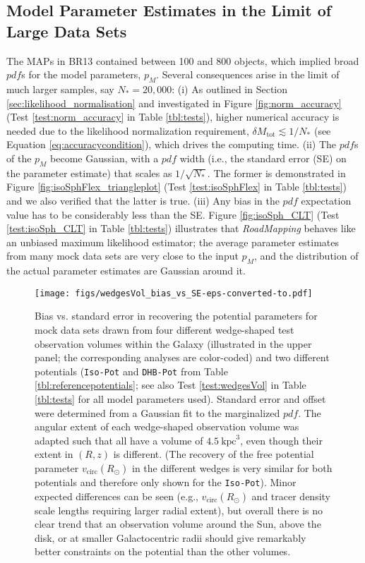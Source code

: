 \documentclass[iop,revtex4,numberedappendix,appendixfloats]{emulateapj}
\newcommand{\pdf}{\ensuremath{pdf}}
\newcommand{\pmodel}{\ensuremath{p_M}}
\newcommand{\MAP}{MAP}
\newcommand{\RM}{{\sl RoadMapping}}
\begin{document}
\subsection{Model Parameter Estimates in the Limit of Large Data Sets} \label{sec:largedata}

The \MAP{}s in BR13 contained between 100 and 800 objects, which implied broad \pdf{}s for the model parameters, $\pmodel{}$. Several consequences arise in the limit of much larger samples, say $N_{*} = 20,000$: (i) As outlined in Section \ref{sec:likelihood_normalisation} and investigated in Figure \ref{fig:norm_accuracy} (Test \ref{test:norm_accuracy} in Table \ref{tbl:tests}), higher numerical accuracy is needed due to the likelihood normalization requirement, $\delta M_\text{tot} \lesssim 1/N_{*}$ (see Equation \eqref{eq:accuracycondition}), which drives the computing time. (ii) The \pdf{}s of the \pmodel{} become Gaussian, with a \pdf{} width (i.e., the standard error (SE) on the parameter estimate) that scales as $1/\sqrt{N_{*}}$. The former is demonstrated in Figure \ref{fig:isoSphFlex_triangleplot} (Test \ref{test:isoSphFlex} in Table \ref{tbl:tests}) and we also verified that the latter is true. (iii) Any bias in the \pdf{} expectation value has to be considerably less than the SE. Figure \ref{fig:isoSph_CLT} (Test \ref{test:isoSph_CLT} in Table \ref{tbl:tests}) illustrates that \RM{} behaves like an unbiased maximum likelihood estimator; the average parameter estimates from many mock data sets are very close to the input \pmodel{}, and the distribution of the actual parameter estimates are Gaussian around it.

\begin{figure}[!htbp]
\centering
\texttt{[image: figs/wedgesVol\_bias\_vs\_SE-eps-converted-to.pdf]}
\caption{Bias vs. standard error in recovering the potential parameters for mock data sets drawn from four different wedge-shaped test observation volumes within the Galaxy (illustrated in the upper panel; the corresponding analyses are color-coded) and two different potentials (\texttt{Iso-Pot} and \texttt{DHB-Pot} from Table \ref{tbl:referencepotentials}; see also Test \ref{test:wedgesVol} in Table \ref{tbl:tests} for all model parameters used). Standard error and offset were determined from a Gaussian fit to the marginalized \pdf{}. The angular extent of each wedge-shaped observation volume was adapted such that all have a volume of $4.5~\text{kpc}^3$, even though their extent in $(R,z)$ is different. (The recovery of the free potential parameter $v_\text{circ}(R_\odot)$ in the different wedges is very similar for both potentials and therefore only shown for the \texttt{Iso-Pot}). Minor expected differences can be seen (e.g., $v_\text{circ}(R_\odot)$ and tracer density scale lengths requiring larger radial extent), but overall there is no clear trend that an observation volume around the Sun, above the disk, or at smaller Galactocentric radii should give remarkably better constraints on the potential than the other volumes.}
\label{fig:wedgesVol_bias_vs_SE}
\end{figure}
\end{document}
